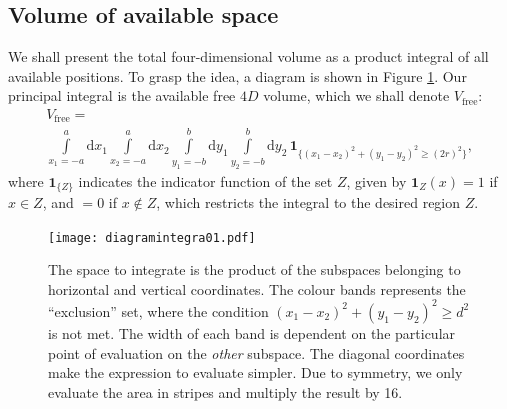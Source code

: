 \documentclass[letterpaper,10pt, jcp, aps]{revtex4-1}
\newcommand{\rd}{\!\mathrm{d}}
\newcommand{\indicator}[1]{\mathbf{1}_{ \{   #1 \} } }
\begin{document}
\subsection{Volume of available space}

We shall present the total four-dimensional volume as a product integral
of all available positions. To grasp the idea, a 
diagram is shown in Figure \ref{diagintegra01}. Our
principal integral is the available free $4D$ volume, which 
we shall denote $V_\text{free}$:
\begin{multline}\label{volindic}
 V_\text{free} = \\ \int\limits_{x_1 = -a}^a \rd x_1 \int\limits_{x_2 = -a}^a \rd x_2 
\int\limits_{y_1 = -b}^b \rd y_1 \int\limits_{y_2 = -b}^b \rd y_2 \, \indicator{ (x_1-x_2)^2 + (y_1-y_2)^2 \ge (2r)^2 },
\end{multline}
where $\indicator{Z}$ indicates the indicator function of the set $Z$, 
given by $\mathbf{1}_Z (x) = 1$ if $x \in Z$, and $=0$ if $x \notin Z$, 
which restricts the integral to the desired region $Z$.
\begin{figure}[h]
  \begin{center}
    \texttt{[image: diagramintegra01.pdf]}
  \end{center}
  \caption{The space to integrate is the product of the subspaces
    belonging to horizontal and vertical coordinates. The colour
    bands represents the ``exclusion'' set, where the condition 
    $ (x_1-x_2)^2 + (y_1-y_2)^2 \ge d^2 $ is not met. 
    The width of each band is dependent on the particular 
    point of evaluation
    on the \emph{other} subspace. The diagonal coordinates
    make the expression to evaluate simpler. Due to 
    symmetry, we only evaluate the area in stripes and
    multiply the result by 16.}\label{diagintegra01}  
\end{figure}
\end{document}
